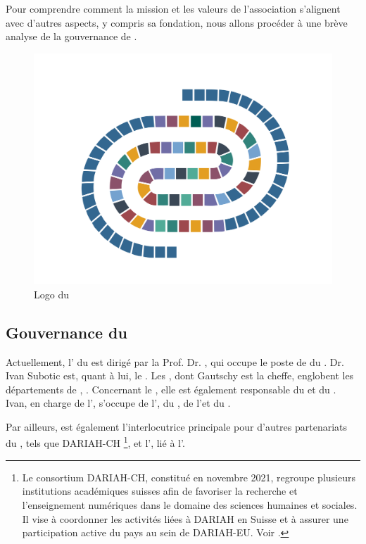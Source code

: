     Pour comprendre comment la mission et les valeurs de l'association s'alignent avec d'autres aspects, y compris sa fondation, nous allons procéder à une brève analyse de la gouvernance de \dsc.

    \begin{figure}[h!]
        \centering
        \includegraphics[width=12cm]{02_images/part_01/00_dasch_logo.png}
        \caption{Logo du \dsc}
    \end{figure}
    
        \subsection{Gouvernance du \dsc}
        
        Actuellement, l' du \dsc est dirigé par la Prof. Dr. \rg, qui occupe le poste de  du . Dr. Ivan Subotic est, quant à lui, le . Les , dont Gautschy est la cheffe, englobent les départements de , . Concernant le , elle est également responsable du  et du . Ivan, en charge de l', s'occupe de l', du , de l'\ux et du .

        Par ailleurs, \rg est également l'interlocutrice principale pour d'autres partenariats du \dsc, tels que DARIAH-CH \footnote{Le consortium DARIAH-CH, constitué en novembre 2021, regroupe plusieurs institutions académiques suisses afin de favoriser la recherche et l'enseignement numériques dans le domaine des sciences humaines et sociales. Il vise à coordonner les activités liées à DARIAH en Suisse et à assurer une participation active du pays au sein de DARIAH-EU. Voir \cite{dariahch}.}, et l', lié à l'\unibas.

